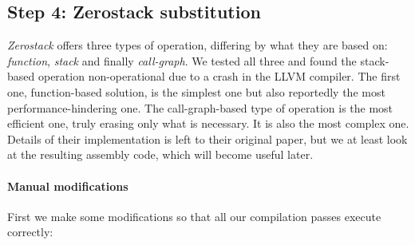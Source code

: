 \documentclass[a4paper,10pt,openright]{memoir}
\newcommand{\term}[1]{\textit{#1}}
\begin{document}
\subsection{Step 4: Zerostack substitution}

\term{Zerostack} offers three types of operation, differing by what 
they are based on: \term{function}, \term{stack} and finally 
\term{call-graph}. We tested all three and found the stack-based 
operation non-operational due to a crash in the LLVM compiler. The first one, function-based 
solution, is the simplest one but also reportedly\cite{whatyouc} the 
most performance-hindering one. The call-graph-based type of operation 
is the most efficient one, truly erasing only what is necessary. It is 
also the most complex one. Details of their implementation is left to 
their original paper\cite{whatyouc}, but we at least look at the 
resulting assembly code, which will become useful later.

\paragraph{Manual modifications}

First we make some modifications so that all our compilation passes 
execute correctly:
\end{document}
